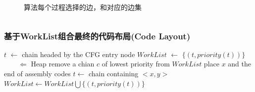\begin{frame}
\begin{columns}
\begin{column}{0.6\textwidth}
\begin{figure}
                \caption{算法每个过程选择的边，和对应的边集}
            \end{figure}
        \end{column}
    \end{columns}

\end{frame}


\begin{frame}
    \frametitle{基于WorkList组合最终的代码布局(Code Layout)}

    \begin{algorithmic}
        \State $t$ $\gets$ chain headed by the CFG entry node
        \State $WorkList$ $\gets$ $\lbrace(t, priority(t))\rbrace$ $ \qquad \Leftarrow$ Heap
        \State remove a chian $c$ of lowest priority from $WorkList$
        \State place $x$ and the end of assembly codes
        \EndFor
        \State $t \gets $ chain containing $<x, y>$
        $WorkList \gets WorkList \bigcup \lbrace (t, priority(t)) \rbrace$
        \EndIf
        \EndFor
        \EndFor
        \EndWhile
    \end{algorithmic}

\end{frame}


